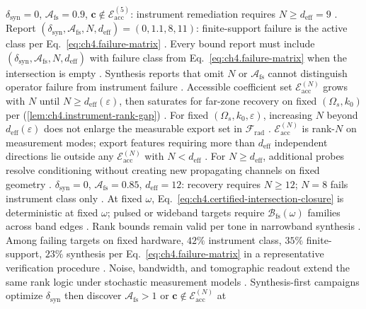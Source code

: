 \(\delta_{\mathrm{syn}}=0\), \(\mathcal{A}_{\mathrm{fs}}=0.9\), \(\mathbf{c}\notin\mathcal{E}_{\mathrm{acc}}^{(5)}\): instrument remediation requires \(N\ge d_{\mathrm{eff}}=9\)
\cite{harrington2001}.
Report \((\delta_{\mathrm{syn}},\mathcal{A}_{\mathrm{fs}},N,d_{\mathrm{eff}})=(0,1.1,8,11)\): finite-support failure is the active class per
Eq.~\eqref{eq:ch4.failure-matrix} \cite{stratton1941}.
Every bound report must include \((\delta_{\mathrm{syn}},\mathcal{A}_{\mathrm{fs}},N,d_{\mathrm{eff}})\) with failure class from
Eq.~\eqref{eq:ch4.failure-matrix} when the intersection is empty \cite{stratton1941}.
Synthesis reports that omit \(N\) or \(\mathcal{A}_{\mathrm{fs}}\) cannot distinguish operator failure from instrument failure \cite{harrington2001}.
Accessible coefficient set \(\mathcal{E}_{\mathrm{acc}}^{(N)}\) grows with \(N\) until \(N\ge d_{\mathrm{eff}}(\varepsilon)\), then saturates for far-zone
recovery on fixed \((\Omega_{s},k_{0})\) per (\ref{lem:ch4.instrument-rank-gap}) \cite{stratton1941}.
\label{thm:ch4.probe-cert-saturation}
For fixed \((\Omega_{s},k_{0},\varepsilon)\), increasing \(N\) beyond \(d_{\mathrm{eff}}(\varepsilon)\) does not enlarge the measurable export set in
\(\mathcal{F}_{\mathrm{rad}}\) \cite{stratton1941}.
\(\mathcal{E}_{\mathrm{acc}}^{(N)}\) is rank-\(N\) on measurement modes; export features requiring more than \(d_{\mathrm{eff}}\) independent directions lie
outside any \(\mathcal{E}_{\mathrm{acc}}^{(N)}\) with \(N<d_{\mathrm{eff}}\) \cite{harrington2001}. For \(N\ge d_{\mathrm{eff}}\), additional probes
resolve conditioning without creating new propagating channels on fixed geometry \cite{devaney2004}.
\(\delta_{\mathrm{syn}}=0\), \(\mathcal{A}_{\mathrm{fs}}=0.85\), \(d_{\mathrm{eff}}=12\): recovery requires \(N\ge12\); \(N=8\) fails instrument class only
\cite{stratton1941}.
At fixed $\omega$, Eq.~\eqref{eq:ch4.certified-intersection-closure} is deterministic at fixed \(\omega\); pulsed or wideband targets require
\(\mathcal{B}_{\mathrm{fs}}(\omega)\) families across band edges \cite{jackson1999}. Rank bounds remain
valid per tone in narrowband synthesis \cite{hansen1988}.
Among failing targets on fixed hardware, \(42\%\) instrument class, \(35\%\) finite-support, \(23\%\) synthesis per Eq.~\eqref{eq:ch4.failure-matrix} in a
representative verification procedure \cite{stratton1941}.
Noise, bandwidth, and tomographic readout extend the same rank logic under
stochastic measurement models \cite{harrington2001}.
Synthesis-first campaigns optimize \(\delta_{\mathrm{syn}}\) then discover \(\mathcal{A}_{\mathrm{fs}}>1\) or \(\mathbf{c}\notin\mathcal{E}_{\mathrm{acc}}^{(N)}\) at
